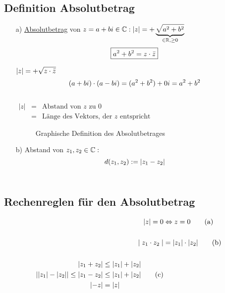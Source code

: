 \subsection{Definition Absolutbetrag}
\begin{enumerate}
\item[a)] \underline{Absolutbetrag} von $z =a+bi \in \mathbb{C}:
\lvert z \rvert = +\underbrace{\sqrt{a^2 +b^2}}_{\in \mathbb{R}, \geq 0}$\\
\begin{equation*}
\boxed{a^2 + b^2 = z \cdot \bar{z}}
\end{equation*}

$\lvert z \rvert= +\sqrt{z \cdot \bar{z}}$\\
$$(a+bi) \cdot (a-bi) = (a^2 +b^2) + 0i = a^2 + b^2$$\\
$
\begin{array}{lcl}
\lvert z \rvert &=& \text{Abstand von $z$ zu 0}\\
&=& \text{L\"ange des Vektors, der $z$ entspricht}
\end{array}$\\
\begin{figure}[h!]
\centering
{}
\caption[Absolutbetrag]{Graphische Definition des Absolutbetrages}
\end{figure}
\item[b)]Abstand von $z_1,z_2 \in \mathbb{C}:$\\
$$ d(z_1,z_2):= \lvert z_1 - z_2 \rvert$$\\
\end{enumerate}
\subsection{Rechenreglen f\"ur den Absolutbetrag}
\begin{align}
\lvert z \rvert = 0 &\Leftrightarrow z =0 \tag{a}\\\notag \\
\mid z_1 \cdot z_2 \mid &= \lvert z_1 \rvert \cdot \lvert z_2 \rvert \tag{b}\\\notag \\
\begin{split}
\lvert z_1 + z_2 \rvert &\leq \lvert z_1 \rvert + \lvert z_2 \rvert\\
\lvert \lvert z_1 \rvert -\lvert z_2 \rvert \rvert \leq \lvert z_1 - z_2 \rvert &\leq \lvert z_1 \rvert + \lvert z_2 \rvert\\
\lvert -z \rvert &= \lvert z \rvert
\end{split}\tag{c}
\end{align}
\newpage
